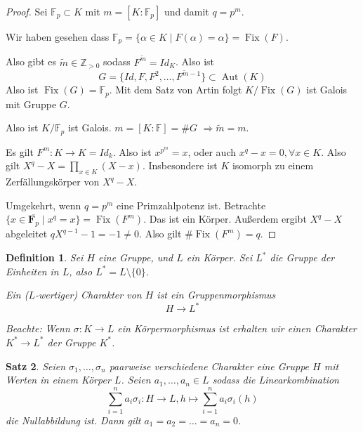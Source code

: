 \documentclass[a4paper,12pt,numbers=noenddot,parskip=full]{scrartcl}
\newcommand{\setZ}{\mathbb{Z}}
\theoremstyle{dotless}
\newtheorem{theorem}{Satz}[section]
\newtheorem{definition}[theorem]{Definition}
\theoremstyle{remark}
\begin{document}
	\begin{proof}
		Sei $\mathbb{F}_p \subset K$ mit $m = [K: \mathbb{F}_p]$ und damit $q = p^m$.
		
		Wir haben gesehen dass $\mathbb{F}_p = \{ \alpha \in K \mid F(\alpha) = \alpha \} = \operatorname{Fix}(F)$.
		
		Also gibt es $\tilde{m} \in \setZ_{>0}$ sodass $F^{\tilde{m}} = Id_K$. Also ist
		\begin{equation*}
			G = \{ Id, F, F^2, \dots, F^{\tilde{m} - 1} \} \subset \operatorname{Aut}(K)
		\end{equation*}
		Also ist $\operatorname{Fix}(G) = \mathbb{F}_p$. Mit dem Satz von Artin folgt $K/\operatorname{Fix}(G)$ ist Galois mit Gruppe $G$.
		
		Also ist $K/\mathbb{F}_p$ ist Galois. $m = [K: \mathbb{F}] = \#G$ $\Rightarrow \tilde{m} = m$.
		
		Es gilt $F^m: K \to K = Id_k$. Also ist $x^{p^m} = x$, oder auch $x^q - x = 0, \forall x \in K$. Also gilt $X^q - X = \prod_{x \in K} (X - x)$. Insbesondere ist $K$ isomorph zu einem Zerfällungskörper von $X^q - X$.
		
		Umgekehrt, wenn $q = p^m$ eine Primzahlpotenz ist. Betrachte $\{ x \in \overline{\mathbf{F}_p} \mid x^q = x \} = \operatorname{Fix}(F^m)$. Das ist ein Körper. Außerdem ergibt $X^q - X$ abgeleitet $q X^{q-1} - 1 = -1 \neq 0$. Also gilt $\#\operatorname{Fix}(F^m) = q$.
	\end{proof}

	\begin{definition}
		Sei $H$ eine Gruppe, und $L$ ein Körper. Sei $L^*$ die Gruppe der Einheiten in $L$, also $L^* = L \setminus \{ 0 \}$.
		
		Ein ($L$-wertiger) Charakter von $H$ ist ein Gruppenmorphismus
		\begin{equation*}
			H \to L^*
		\end{equation*}
		
		Beachte: Wenn $\sigma: K \to L$ ein Körpermorphismus ist erhalten wir einen Charakter $K^* \to L^*$ der Gruppe $K^*$.
	\end{definition}

	\begin{theorem}
		Seien $\sigma_1, \dots, \sigma_n$ paarweise verschiedene Charakter eine Gruppe $H$ mit Werten in einem Körper $L$. Seien $a_1, \dots, a_n \in L$ sodass die Linearkombination
		\begin{equation*}
			\sum_{i = 1}^n a_i \sigma_i: H \to L, h \mapsto \sum_{i = 1}^n a_i \sigma_i(h)
		\end{equation*}
		die Nullabbildung ist. Dann gilt $a_1 = a_2 = \dots = a_n = 0$.
	\end{theorem}
\end{document}
